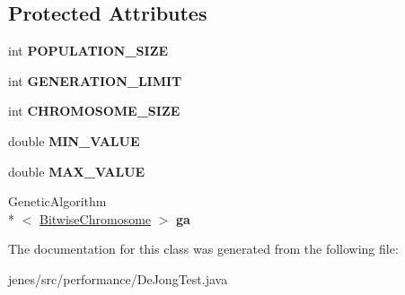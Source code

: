 \subsection*{Protected Attributes}
\begin{DoxyCompactItemize}
\item 
\hypertarget{classjenes_1_1performance_1_1_de_jong_test_afd51b198721f632271f79c99a424ea50}{int {\bfseries P\-O\-P\-U\-L\-A\-T\-I\-O\-N\-\_\-\-S\-I\-Z\-E}}\label{classjenes_1_1performance_1_1_de_jong_test_afd51b198721f632271f79c99a424ea50}

\item 
\hypertarget{classjenes_1_1performance_1_1_de_jong_test_ae39588619e1072e384d5a3f7891ed6ec}{int {\bfseries G\-E\-N\-E\-R\-A\-T\-I\-O\-N\-\_\-\-L\-I\-M\-I\-T}}\label{classjenes_1_1performance_1_1_de_jong_test_ae39588619e1072e384d5a3f7891ed6ec}

\item 
\hypertarget{classjenes_1_1performance_1_1_de_jong_test_a96e009580c2dc5f12763e85c90075813}{int {\bfseries C\-H\-R\-O\-M\-O\-S\-O\-M\-E\-\_\-\-S\-I\-Z\-E}}\label{classjenes_1_1performance_1_1_de_jong_test_a96e009580c2dc5f12763e85c90075813}

\item 
\hypertarget{classjenes_1_1performance_1_1_de_jong_test_a7bad08ed6ec02f47de08ae0bfe99e46a}{double {\bfseries M\-I\-N\-\_\-\-V\-A\-L\-U\-E}}\label{classjenes_1_1performance_1_1_de_jong_test_a7bad08ed6ec02f47de08ae0bfe99e46a}

\item 
\hypertarget{classjenes_1_1performance_1_1_de_jong_test_a9f4f1ca8380c04ab2e909d0370134b81}{double {\bfseries M\-A\-X\-\_\-\-V\-A\-L\-U\-E}}\label{classjenes_1_1performance_1_1_de_jong_test_a9f4f1ca8380c04ab2e909d0370134b81}

\item 
\hypertarget{classjenes_1_1performance_1_1_de_jong_test_af9f864ad4d54d913cbd97266a0a1c5a7}{Genetic\-Algorithm\\*
$<$ \hyperlink{classjenes_1_1chromosome_1_1_bitwise_chromosome}{Bitwise\-Chromosome} $>$ {\bfseries ga}}\label{classjenes_1_1performance_1_1_de_jong_test_af9f864ad4d54d913cbd97266a0a1c5a7}

\end{DoxyCompactItemize}


The documentation for this class was generated from the following file\-:\begin{DoxyCompactItemize}
\item 
jenes/src/performance/De\-Jong\-Test.\-java\end{DoxyCompactItemize}
